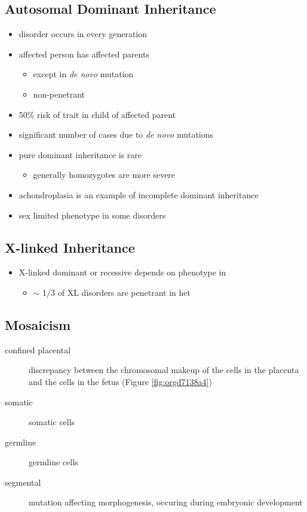 \documentclass[12pt]{scrartcl}
\begin{document}
\subsection{Autosomal Dominant Inheritance}
\label{sec:org0a67b35}
\begin{itemize}
\item disorder occurs in every generation
\item affected person has affected parents
\begin{itemize}
\item except in \emph{de novo} mutation
\item non-penetrant
\end{itemize}
\item 50\% risk of trait in child of affected parent
\item significant number of cases due to \emph{de novo} mutations

\item pure dominant inheritance is rare
\begin{itemize}
\item generally homozygotes are more severe
\end{itemize}
\item achondroplasia is an example of incomplete dominant inheritance
\item sex limited phenotype in some disorders
\end{itemize}

\subsection{X-linked Inheritance}
\label{sec:orgbd5f0ca}
\begin{itemize}
\item X-linked dominant or recessive depends on phenotype in \female
\begin{itemize}
\item \(\sim\) 1/3 of XL disorders are penetrant in het \female
\end{itemize}
\end{itemize}

\subsection{Mosaicism}
\label{sec:org17c896b}
\begin{description}
\item[{confined placental}] discrepancy between the chromosomal makeup of
the cells in the placenta and the cells in the fetus (Figure \ref{fig:orgd7138a4})
\item[{somatic}] somatic cells
\item[{germline}] germline cells
\item[{segmental}] mutation affecting morphogenesis, occuring during
embryonic development
\end{description}
\end{document}
